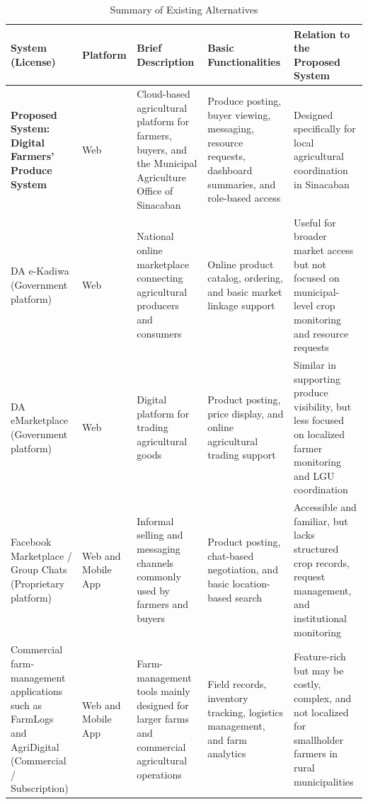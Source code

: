 \begin{table}[ht]
\centering
\caption{Summary of Existing Alternatives}
\label{table:existing-alternatives-summary}
\renewcommand{\arraystretch}{1.3}
\setlength{\tabcolsep}{4pt}
\footnotesize
\begin{tabular}{|>{\raggedright\arraybackslash}p{2.8cm}|
                    >{\raggedright\arraybackslash}p{1.8cm}|
                    >{\raggedright\arraybackslash}p{3.0cm}|
                    >{\raggedright\arraybackslash}p{3.0cm}|
                    >{\raggedright\arraybackslash}p{3.0cm}|}
\hline
\textbf{System (License)} &
\textbf{Platform} &
\textbf{Brief Description} &
\textbf{Basic Functionalities} &
\textbf{Relation to the Proposed System} \\
\hline\hline

\textbf{Proposed System: Digital Farmers' Produce System} &
Web &
Cloud-based agricultural platform for farmers, buyers, and the Municipal Agriculture Office of Sinacaban &
Produce posting, buyer viewing, messaging, resource requests, dashboard summaries, and role-based access &
Designed specifically for local agricultural coordination in Sinacaban \\
\hline

DA e-Kadiwa (Government platform) &
Web &
National online marketplace connecting agricultural producers and consumers &
Online product catalog, ordering, and basic market linkage support &
Useful for broader market access but not focused on municipal-level crop monitoring and resource requests \\
\hline

DA eMarketplace (Government platform) &
Web &
Digital platform for trading agricultural goods &
Product posting, price display, and online agricultural trading support &
Similar in supporting produce visibility, but less focused on localized farmer monitoring and LGU coordination \\
\hline

Facebook Marketplace / Group Chats (Proprietary platform) &
Web and Mobile App &
Informal selling and messaging channels commonly used by farmers and buyers &
Product posting, chat-based negotiation, and basic location-based search &
Accessible and familiar, but lacks structured crop records, request management, and institutional monitoring \\
\hline

Commercial farm-management applications such as FarmLogs and AgriDigital (Commercial / Subscription) &
Web and Mobile App &
Farm-management tools mainly designed for larger farms and commercial agricultural operations &
Field records, inventory tracking, logistics management, and farm analytics &
Feature-rich but may be costly, complex, and not localized for smallholder farmers in rural municipalities \\
\hline
\end{tabular}
\end{table}